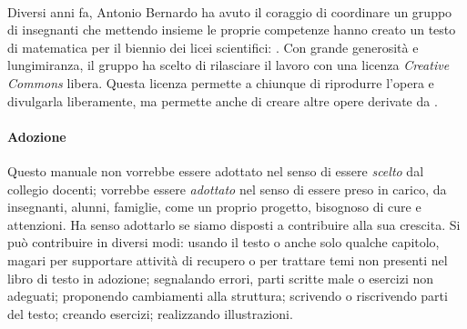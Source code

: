 \paragraph{\serie}
Diversi anni fa, Antonio Bernardo ha avuto il coraggio di coordinare un
gruppo di insegnanti che mettendo insieme le proprie competenze hanno creato
un testo di matematica per il biennio dei licei scientifici: \emph{\serie}.
Con grande generosità e lungimiranza, il gruppo ha scelto di rilasciare il
lavoro con una licenza \textit{Creative Commons} libera.
Questa licenza permette
a chiunque di riprodurre l'opera e divulgarla liberamente, ma permette anche
di creare altre opere derivate da \emph{\serie}.

%
%

\paragraph{Adozione} Questo manuale non vorrebbe essere adottato nel
senso di essere \emph{scelto} dal collegio docenti; vorrebbe essere
\emph{adottato} nel senso di essere preso in carico, da insegnanti, alunni,
famiglie, come un proprio progetto, bisognoso di cure e attenzioni.
Ha senso adottarlo se siamo disposti a contribuire alla sua crescita.
Si può contribuire in diversi modi:
 usando il testo o anche solo qualche capitolo, magari per supportare
 attività di recupero o per trattare temi non presenti nel libro di
 testo in adozione;
 segnalando errori, parti scritte male o esercizi non adeguati;
 proponendo cambiamenti alla struttura;
 scrivendo o riscrivendo parti del testo;
 creando esercizi;
 realizzando illustrazioni.

